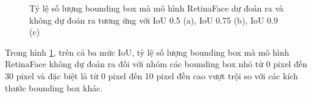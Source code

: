 {    \begin{figure}[H]
        \centering
        \caption{Tỷ lệ số lượng bounding box mà mô hình RetinaFace dự đoán ra và không dự đoán ra tương ứng với IoU 0.5 (a), IoU 0.75 (b), IoU 0.9 (c)}
        \label{fig:retinafocus_iou_compare_percent}
    \end{figure}

    \noindent
    Trong hình \ref{fig:retinafocus_iou_compare_percent}, trên cả ba mức IoU, tỷ lệ số lượng bounding box mà mô hình RetinaFace không dự đoán ra đối với nhóm các bounding box nhỏ từ 0 pixel đến 30 pixel và đặc biệt là từ 0 pixel đến 10 pixel đều cao vượt trội so với các kích thước bounding box khác.


}
